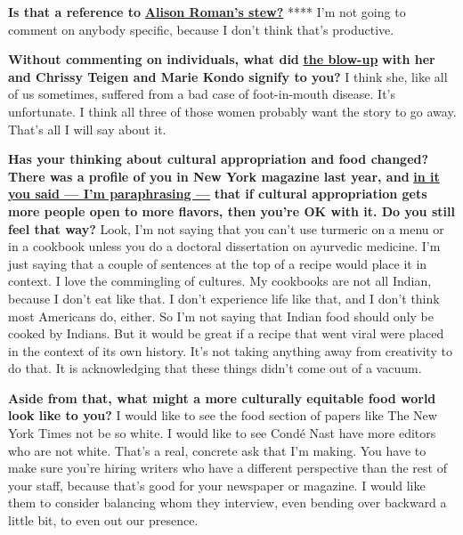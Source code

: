 \textbf{Is that a reference to}
\textbf{\href{http://nytimes.com\#tooltip-5}{Alison Roman's stew?}} ****
I'm not going to comment on anybody specific, because I don't think
that's productive.

\textbf{Without commenting on individuals, what did}
\textbf{\href{http://nytimes.com\#tooltip-6}{the blow-up}} \textbf{with
her and Chrissy Teigen and Marie Kondo signify to you?} I think she,
like all of us sometimes, suffered from a bad case of foot-in-mouth
disease. It's unfortunate. I think all three of those women probably
want the story to go away. That's all I will say about it.

\textbf{Has your thinking about cultural appropriation and food changed?
There was a profile of you in New York magazine last year, and}
\textbf{\href{http://nytimes.com\#tooltip-7}{in it you said --- I'm
paraphrasing ---}} \textbf{that if cultural appropriation gets more
people open to more flavors, then you're OK with it. Do you still feel
that way?} Look, I'm not saying that you can't use turmeric on a menu or
in a cookbook unless you do a doctoral dissertation on ayurvedic
medicine. I'm just saying that a couple of sentences at the top of a
recipe would place it in context. I love the commingling of cultures. My
cookbooks are not all Indian, because I don't eat like that. I don't
experience life like that, and I don't think most Americans do, either.
So I'm not saying that Indian food should only be cooked by Indians. But
it would be great if a recipe that went viral were placed in the context
of its own history. It's not taking anything away from creativity to do
that. It is acknowledging that these things didn't come out of a vacuum.

\textbf{Aside from that, what might a more culturally equitable food
world look like to you?} I would like to see the food section of papers
like The New York Times not be so white. I would like to see Condé Nast
have more editors who are not white. That's a real, concrete ask that
I'm making. You have to make sure you're hiring writers who have a
different perspective than the rest of your staff, because that's good
for your newspaper or magazine. I would like them to consider balancing
whom they interview, even bending over backward a little bit, to even
out our presence.

